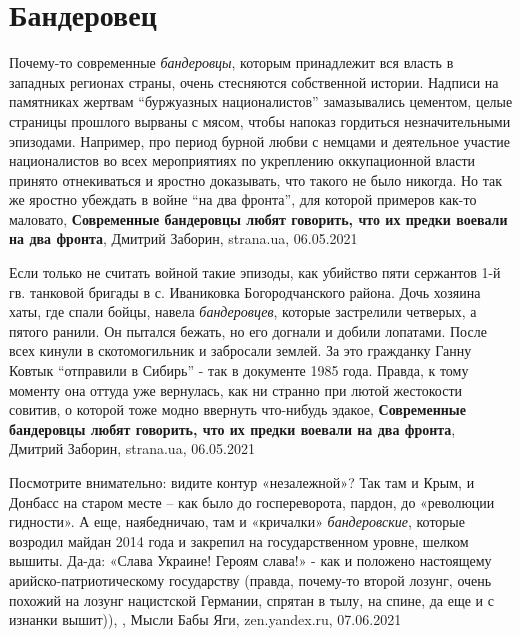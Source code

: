  
 
 
 
 
\chapter{Бандеровец}

Почему-то современные \emph{бандеровцы}, которым принадлежит вся власть в западных
регионах страны, очень стесняются собственной истории. Надписи на памятниках
жертвам \enquote{буржуазных националистов} замазывались цементом, целые страницы
прошлого вырваны с мясом, чтобы напоказ гордиться незначительными эпизодами.
Например, про период бурной любви с немцами и деятельное участие националистов
во всех мероприятиях по укреплению оккупационной власти принято отнекиваться и
яростно доказывать, что такого не было никогда. Но так же яростно убеждать в
войне \enquote{на два фронта}, для которой примеров как-то маловато,
\textbf{Современные бандеровцы любят говорить, что их предки воевали на два фронта},
Дмитрий Заборин, strana.ua, 06.05.2021

Если только не считать войной такие эпизоды, как убийство пяти сержантов 1-й
гв. танковой бригады в с. Иваниковка Богородчанского района. Дочь хозяина хаты,
где спали бойцы, навела \emph{бандеровцев}, которые застрелили четверых, а пятого
ранили. Он пытался бежать, но его догнали и добили лопатами. После всех кинули
в скотомогильник и забросали землей.  За это гражданку Ганну Ковтык
\enquote{отправили в Сибирь} - так в документе 1985 года. Правда, к тому
моменту она оттуда уже вернулась, как ни странно при лютой жестокости совитив,
о которой тоже модно ввернуть что-нибудь эдакое,
\textbf{Современные бандеровцы любят говорить, что их предки воевали на два фронта},
Дмитрий Заборин, strana.ua, 06.05.2021

Посмотрите внимательно: видите контур «незалежной»? Так там и Крым, и Донбасс
на старом месте – как было до госпереворота, пардон, до «революции гидности». А
еще, наябедничаю, там и «кричалки» \emph{бандеровские}, которые возродил майдан
2014 года и закрепил на государственном уровне, шелком вышиты. Да-да: «Слава
Украине! Героям слава!» - как и положено настоящему арийско-патриотическому
государству (правда, почему-то второй лозунг, очень похожий на лозунг
нацистской Германии, спрятан в тылу, на спине, да еще и с изнанки вышит)),
, Мысли Бабы Яги, zen.yandex.ru, 07.06.2021

